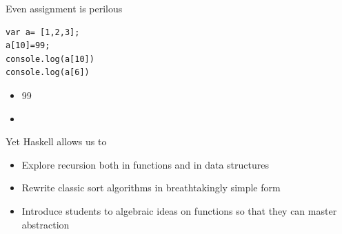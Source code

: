 \documentclass[presetation]{beamer}
\begin{document}
\begin{frame}[fragile,label={sec:orgc9473cd}]{Even assignment is perilous}
 \begin{verbatim}
var a= [1,2,3];
a[10]=99;
console.log(a[10])
console.log(a[6])
\end{verbatim}
\pause
\begin{itemize}
\item 99
\item{}
\end{itemize}
\end{frame}

\begin{frame}[label={sec:orgcb611c4}]{Yet Haskell allows us to}
\pause
\begin{itemize}
\item Explore recursion both in functions and in data structures
\end{itemize}
\pause
\begin{itemize}
\item Rewrite classic sort algorithms in breathtakingly simple form
\end{itemize}
\pause
\begin{itemize}
\item Introduce students to algebraic ideas on functions so that they can
master abstraction
\end{itemize}
\end{frame}
\end{document}
